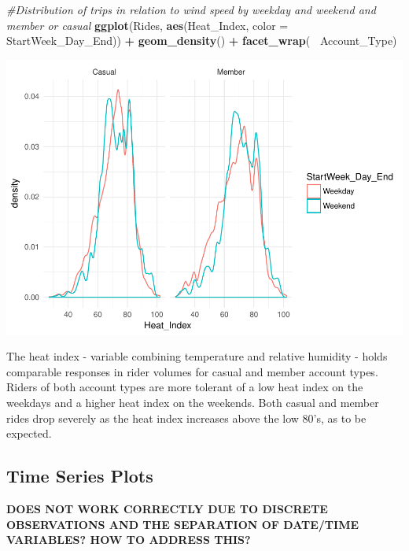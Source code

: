 \documentclass[]{article}
\newenvironment{Shaded}{\begin{snugshade}}{\end{snugshade}}
\newcommand{\KeywordTok}[1]{\textcolor[rgb]{0.13,0.29,0.53}{\textbf{#1}}}
\newcommand{\DataTypeTok}[1]{\textcolor[rgb]{0.13,0.29,0.53}{#1}}
\newcommand{\StringTok}[1]{\textcolor[rgb]{0.31,0.60,0.02}{#1}}
\newcommand{\CommentTok}[1]{\textcolor[rgb]{0.56,0.35,0.01}{\textit{#1}}}
\newcommand{\OperatorTok}[1]{\textcolor[rgb]{0.81,0.36,0.00}{\textbf{#1}}}
\newcommand{\NormalTok}[1]{#1}
\begin{document}
\begin{Shaded}
\begin{Highlighting}[]
\CommentTok{#Distribution of trips in relation to wind speed by weekday and weekend and member or casual}
\KeywordTok{ggplot}\NormalTok{(Rides, }\KeywordTok{aes}\NormalTok{(Heat_Index, }\DataTypeTok{color =}\NormalTok{ StartWeek_Day_End)) }\OperatorTok{+}\StringTok{ }\KeywordTok{geom_density}\NormalTok{() }\OperatorTok{+}\StringTok{ }\KeywordTok{facet_wrap}\NormalTok{(}\OperatorTok{~}\StringTok{ }\NormalTok{Account_Type)}
\end{Highlighting}
\end{Shaded}

\includegraphics{Nice_Ride_Project_Stat_ReportDRAFT_files/figure-latex/unnamed-chunk-15-3.pdf}

The heat index - variable combining temperature and relative humidity -
holds comparable responses in rider volumes for casual and member
account types. Riders of both account types are more tolerant of a low
heat index on the weekdays and a higher heat index on the weekends. Both
casual and member rides drop severely as the heat index increases above
the low 80's, as to be expected.

\subsection{Time Series Plots}\label{time-series-plots}

\textbf{DOES NOT WORK CORRECTLY DUE TO DISCRETE OBSERVATIONS AND THE
SEPARATION OF DATE/TIME VARIABLES? HOW TO ADDRESS THIS?}

\begin{Shaded}
\end{Shaded}
\end{document}
